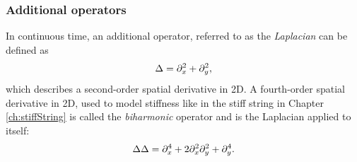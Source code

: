 \subsubsection{Additional operators}
In continuous time, an additional operator, referred to as the \textit{Laplacian} can be defined as
\begin{equation}\label{eq:laplacian}
    \Delta = \partial_x^2 + \partial_y^2,
\end{equation}
which describes a second-order spatial derivative in 2D. A fourth-order spatial derivative in 2D, used to model stiffness like in the stiff string in Chapter \ref{ch:stiffString} is called the \textit{biharmonic} operator and is the Laplacian applied to itself:
\begin{equation}\label{eq:biharmonic}
    \Delta\Delta = \partial_x^4 + 2\partial_x^2\partial_y^2 +  \partial_y^4.
\end{equation}


